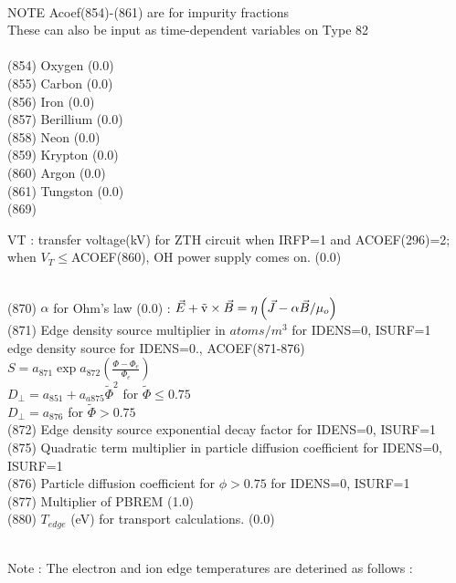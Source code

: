 \begin{tabbing}
    \>         \\
NOTE \> Acoef(854)-(861) are for impurity fractions \\
     \> These can also be input as time-dependent variables on Type 82 \\
    \>         \\
(854) \> Oxygen (0.0)\\
(855) \> Carbon (0.0)\\
(856) \> Iron (0.0) \\
(857) \> Berillium (0.0)\\
(858) \> Neon (0.0)\\
(859) \> Krypton (0.0) \\
(860) \> Argon (0.0) \\
(861) \> Tungston (0.0) \\
(869) \> \parbox[t]{\width}{VT : transfer voltage(kV) for ZTH circuit when IRFP=1 and
ACOEF(296)=2; when $V_T \leq$ACOEF(860), OH power supply comes on. (0.0)} \\
(870) \> $\alpha$ for Ohm's law (0.0) : $\vec E + {\rm \vec{v}} \times \vec B = \eta \left( \vec 
J - \alpha \vec B / \mu_o \right)$ \\
(871) \> Edge density source multiplier in $atoms/m^3$  for IDENS=0, ISURF=1 \\
\> edge density source for IDENS=0., ACOEF(871-876) \\
\> $S=a_{871} \exp{a_{872} (\frac{\Phi - \Phi_{e}}{\Phi_{e}})}$ \\
\> $D_{\bot}=a_{851}+a_{a875} \tilde{\Phi}^{2}$ for $\tilde{\Phi} \leq 0.75$ \\
\> $D_{\bot}=a_{876}$ for $\tilde{\Phi} > 0.75$ \\
(872) \> Edge density source exponential decay factor for IDENS=0, ISURF=1\\
(875) \> Quadratic term multiplier in particle diffusion coefficient for IDENS=0, ISURF=1 \\
(876) \> Particle diffusion coefficient for $\phi>0.75$ for IDENS=0, ISURF=1\\
(877) \> Multiplier of PBREM (1.0) \\
(880) \> $T_{edge}$ (eV) for transport calculations. (0.0)\\
  \\
\>\parbox[t]{\width}{Note :  The electron  and  ion edge temperatures  are  deterined  as follows :   \label{p:tedge}}\\
 \\

\end{tabbing}
